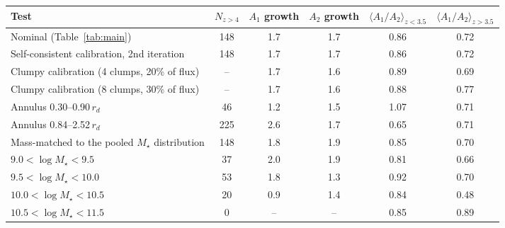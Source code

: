 \begin{tabular}{lccccc}
\toprule
Test & $N_{z>4}$ & $A_1$ growth & $A_2$ growth & $\langle A_1/A_2\rangle_{z<3.5}$ & $\langle A_1/A_2\rangle_{z>3.5}$\\
\midrule
Nominal (Table~\ref{tab:main}) & 148 & 1.7 & 1.7 & 0.86 & 0.72\\
Self-consistent calibration, 2nd iteration & 148 & 1.7 & 1.7 & 0.86 & 0.72\\
Clumpy calibration (4 clumps, 20\% of flux) & -- & 1.7 & 1.6 & 0.89 & 0.69\\
Clumpy calibration (8 clumps, 30\% of flux) & -- & 1.7 & 1.6 & 0.88 & 0.77\\
Annulus 0.30--0.90\,$r_d$ & 46 & 1.2 & 1.5 & 1.07 & 0.71\\
Annulus 0.84--2.52\,$r_d$ & 225 & 2.6 & 1.7 & 0.65 & 0.71\\
Mass-matched to the pooled $M_\star$ distribution & 148 & 1.8 & 1.9 & 0.85 & 0.70\\
$9.0<\log M_\star<9.5$ & 37 & 2.0 & 1.9 & 0.81 & 0.66\\
$9.5<\log M_\star<10.0$ & 53 & 1.8 & 1.3 & 0.92 & 0.70\\
$10.0<\log M_\star<10.5$ & 20 & 0.9 & 1.4 & 0.84 & 0.48\\
$10.5<\log M_\star<11.5$ & 0 & -- & -- & 0.85 & 0.89\\
\bottomrule
\end{tabular}
